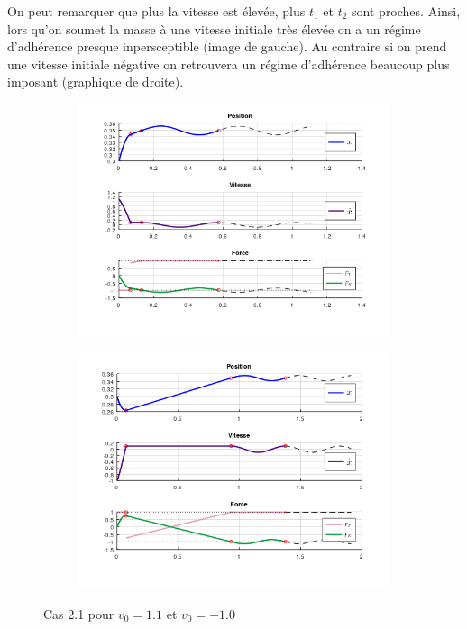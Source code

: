 \documentclass{article}
\begin{document}
On peut remarquer que plus la vitesse est élevée, plus $t_1$ et $t_2$ sont proches. Ainsi, lors qu'on soumet la masse à  une vitesse initiale très élevée on a un régime d'adhérence presque inpersceptible (image de gauche). Au contraire si on prend une vitesse initiale négative on retrouvera un régime d'adhérence beaucoup plus imposant (graphique de droite).
\begin{figure}[h!]
  \centering
  \hspace{-4cm}
  \begin{subfigure}[b]{.49\textwidth}
    \includegraphics[width = 1.5\linewidth]{CAS2_1a.png}
  \end{subfigure}
    \begin{subfigure}[b]{.49\textwidth}
    \includegraphics[width = 1.5\linewidth]{CAS2_1b.png}
  \end{subfigure}
  \caption{Cas 2.1 pour $v_0 = 1.1$ et $v_0 = -1.0$}

\end{figure}
\end{document}
